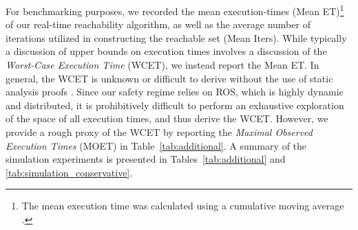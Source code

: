 \documentclass[manuscript,screen,review]{acmart}
\begin{document}
For benchmarking purposes, we recorded the mean execution-times (Mean ET)\footnote{The mean execution time was calculated using a cumulative moving average \cite{Jin2019}.} of our real-time reachability algorithm, as well as the average number of iterations utilized in constructing the reachable set (Mean Iters). While typically a discussion of upper bounds on execution times involves a discussion of the \emph{Worst-Case Execution Time} (WCET), we instead report the Mean ET. In general, the WCET is unknown or difficult to derive without the use of static analysis proofs \cite{Reinhard2008}. Since our safety regime relies on ROS, which is highly dynamic and distributed, it is prohibitively difficult to perform an exhaustive exploration of the space of all execution times, and thus derive the WCET.  However, we provide a rough proxy of the WCET by reporting the \emph{Maximal Observed Execution Times} (MOET)  \cite{Reinhard2008} in Table~\ref{tab:additional}. %
A summary of the simulation experiments is presented in Tables~\ref{tab:additional} and \ref{tab:simulation_conservative}.
\end{document}

